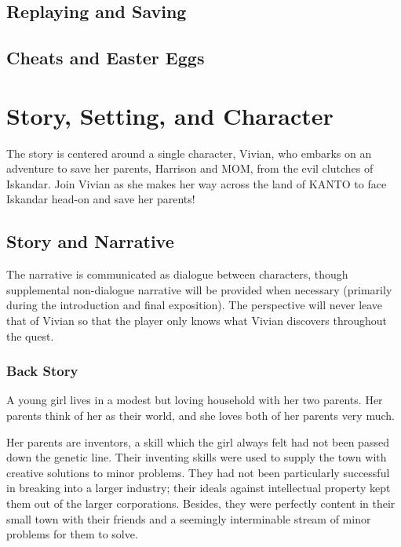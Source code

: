\documentclass[12pt,titlepage]{article}
\newcommand\protagonist{Vivian\xspace}
\newcommand\dad{Harrison\xspace}
\newcommand\mom{MOM\xspace}
\newcommand\evilcorp{Iskandar\xspace}
\newcommand\world{KANTO\xspace}
\begin{document}
\subsection{Replaying and Saving}

\subsection{Cheats and Easter Eggs}

\newpage
\section{Story, Setting, and Character}

The story is centered around a single character, \protagonist, who embarks on an
adventure to save her parents, \dad and \mom, from the evil clutches of
\evilcorp. Join \protagonist as she makes her way across the land of \world to
face \evilcorp head-on and save her parents!

\subsection{Story and Narrative}

The narrative is communicated as dialogue between characters, though
supplemental non-dialogue narrative will be provided when necessary (primarily
during the introduction and final exposition). The perspective will never leave
that of \protagonist so that the player only knows what \protagonist discovers
throughout the quest.

\subsubsection{Back Story}

A young girl lives in a modest but loving household with her two parents. Her
parents think of her as their world, and she loves both of her parents very
much.

Her parents are inventors, a skill which the girl always felt had not been
passed down the genetic line. Their inventing skills were used to supply the
town with creative solutions to minor problems. They had not been particularly
successful in breaking into a larger industry; their ideals against intellectual
property kept them out of the larger corporations. Besides, they were perfectly
content in their small town with their friends and a seemingly interminable
stream of minor problems for them to solve.
\end{document}
